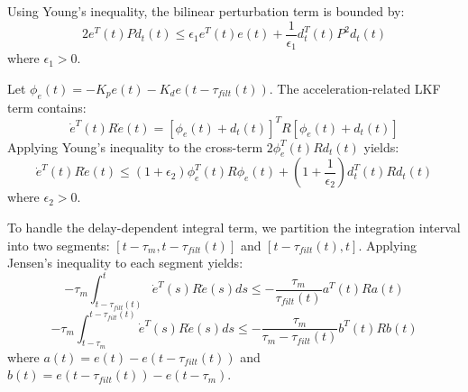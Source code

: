 \documentclass[letterpaper,journal]{IEEEtran}
\begin{document}
Using Young's inequality, the bilinear perturbation term is bounded by:
\begin{equation}
2 e^T(t) P d_t(t) \le \epsilon_1 e^T(t) e(t) + \frac{1}{\epsilon_1} d_t^T(t) P^2 d_t(t)
\end{equation}
where $\epsilon_1 > 0$.

Let $\phi_e(t) = -K_p e(t) - K_d e(t - \tau_{filt}(t))$. The acceleration-related LKF term contains:
\begin{equation}
\dot{e}^T(t) R \dot{e}(t) = \left[ \phi_e(t) + d_t(t) \right]^T R \left[ \phi_e(t) + d_t(t) \right]
\end{equation}
Applying Young's inequality to the cross-term $2 \phi_e^T(t) R d_t(t)$ yields:
\begin{equation}
\dot{e}^T(t) R \dot{e}(t) \le (1 + \epsilon_2) \phi_e^T(t) R \phi_e(t) + \left( 1 + \frac{1}{\epsilon_2} \right) d_t^T(t) R d_t(t)
\end{equation}
where $\epsilon_2 > 0$.

To handle the delay-dependent integral term, we partition the integration interval into two segments: $[t - \tau_m, t - \tau_{filt}(t)]$ and $[t - \tau_{filt}(t), t]$. Applying Jensen's inequality to each segment yields:
\begin{equation}
-\tau_m \int_{t - \tau_{filt}(t)}^{t} \dot{e}^T(s) R \dot{e}(s) ds \le -\frac{\tau_m}{\tau_{filt}(t)} a^T(t) R a(t)
\end{equation}
\begin{equation}
-\tau_m \int_{t - \tau_m}^{t-\tau_{filt}(t)} \dot{e}^T(s) R \dot{e}(s) ds \le -\frac{\tau_m}{\tau_m - \tau_{filt}(t)} b^T(t) R b(t)
\end{equation}
where $a(t) = e(t) - e(t-\tau_{filt}(t))$ and $b(t) = e(t-\tau_{filt}(t)) - e(t-\tau_m)$.
\end{document}
